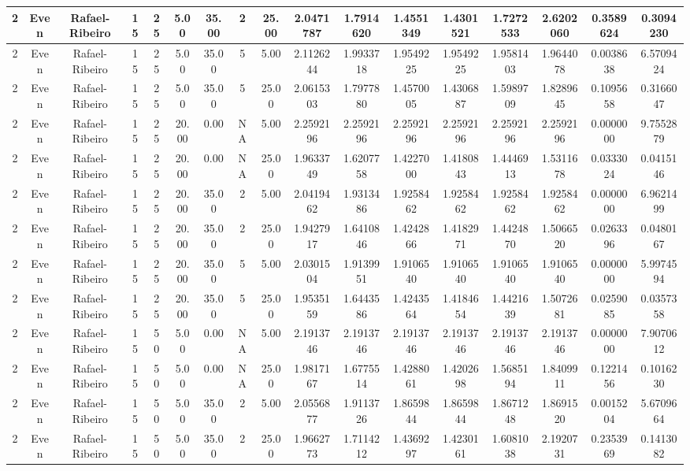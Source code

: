 \documentclass[a4paper]{article}
\begin{document}
\begin{center}
\begin{tabular}{ | c | c | c | c | c | c | c | c | c | c | c | c | c | c | c | c | c | }
		\hline
		2	&	Even	&	Rafael-Ribeiro	&	15	&	25	&	5.00	&	35.00	&	2	&	25.00	&	2.0471787	&	1.7914620	&	1.4551349	&	1.4301521	&	1.7272533	&	2.6202060	&	0.3589624	&	0.3094230 \\
		\hline
		2	&	Even	&	Rafael-Ribeiro	&	15	&	25	&	5.00	&	35.00	&	5	&	5.00	&	2.1126244	&	1.9933718	&	1.9549225	&	1.9549225	&	1.9581403	&	1.9644078	&	0.0038638	&	6.5709424 \\
		\hline
		2	&	Even	&	Rafael-Ribeiro	&	15	&	25	&	5.00	&	35.00	&	5	&	25.00	&	2.0615303	&	1.7977880	&	1.4570005	&	1.4306887	&	1.5989709	&	1.8289645	&	0.1095658	&	0.3166047 \\
		\hline
		2	&	Even	&	Rafael-Ribeiro	&	15	&	25	&	20.00	&	0.00	&	NA	&	5.00	&	2.2592196	&	2.2592196	&	2.2592196	&	2.2592196	&	2.2592196	&	2.2592196	&	0.0000000	&	9.7552879 \\
		\hline
		2	&	Even	&	Rafael-Ribeiro	&	15	&	25	&	20.00	&	0.00	&	NA	&	25.00	&	1.9633749	&	1.6207758	&	1.4227000	&	1.4180843	&	1.4446913	&	1.5311678	&	0.0333024	&	0.0415146 \\
		\hline
		2	&	Even	&	Rafael-Ribeiro	&	15	&	25	&	20.00	&	35.00	&	2	&	5.00	&	2.0419462	&	1.9313486	&	1.9258462	&	1.9258462	&	1.9258462	&	1.9258462	&	0.0000000	&	6.9621499 \\
		\hline
		2	&	Even	&	Rafael-Ribeiro	&	15	&	25	&	20.00	&	35.00	&	2	&	25.00	&	1.9427917	&	1.6410846	&	1.4242866	&	1.4182971	&	1.4424870	&	1.5066520	&	0.0263396	&	0.0480167 \\
		\hline
		2	&	Even	&	Rafael-Ribeiro	&	15	&	25	&	20.00	&	35.00	&	5	&	5.00	&	2.0301504	&	1.9139951	&	1.9106540	&	1.9106540	&	1.9106540	&	1.9106540	&	0.0000000	&	5.9974594 \\
		\hline
		2	&	Even	&	Rafael-Ribeiro	&	15	&	25	&	20.00	&	35.00	&	5	&	25.00	&	1.9535159	&	1.6443586	&	1.4243564	&	1.4184654	&	1.4421639	&	1.5072681	&	0.0259085	&	0.0357358 \\
		\hline
		2	&	Even	&	Rafael-Ribeiro	&	15	&	50	&	5.00	&	0.00	&	NA	&	5.00	&	2.1913746	&	2.1913746	&	2.1913746	&	2.1913746	&	2.1913746	&	2.1913746	&	0.0000000	&	7.9070612 \\
		\hline
		2	&	Even	&	Rafael-Ribeiro	&	15	&	50	&	5.00	&	0.00	&	NA	&	25.00	&	1.9817167	&	1.6775514	&	1.4288061	&	1.4202698	&	1.5685194	&	1.8409911	&	0.1221456	&	0.1016230 \\
		\hline
		2	&	Even	&	Rafael-Ribeiro	&	15	&	50	&	5.00	&	35.00	&	2	&	5.00	&	2.0556877	&	1.9113726	&	1.8659844	&	1.8659844	&	1.8671248	&	1.8691520	&	0.0015204	&	5.6709664 \\
		\hline
		2	&	Even	&	Rafael-Ribeiro	&	15	&	50	&	5.00	&	35.00	&	2	&	25.00	&	1.9662773	&	1.7114212	&	1.4369297	&	1.4230161	&	1.6081038	&	2.1920731	&	0.2353969	&	0.1413082 \\

\end{tabular}
\end{center}
\end{document}
